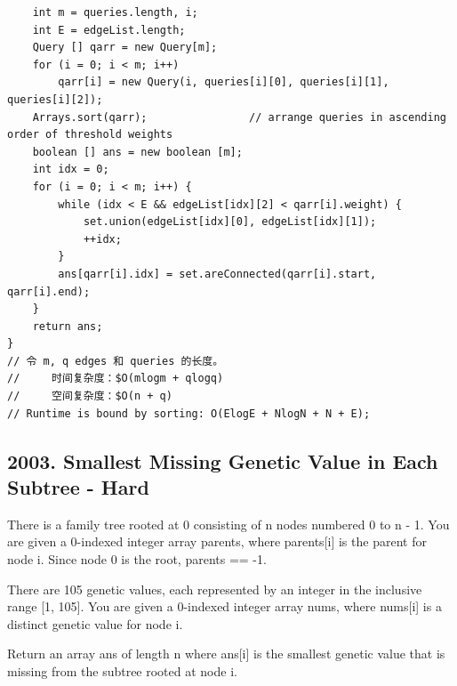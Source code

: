 \documentclass[9pt, b5paper]{article}
\begin{document}
\begin{verbatim}
    int m = queries.length, i;
    int E = edgeList.length;
    Query [] qarr = new Query[m];
    for (i = 0; i < m; i++) 
        qarr[i] = new Query(i, queries[i][0], queries[i][1], queries[i][2]);
    Arrays.sort(qarr);                // arrange queries in ascending order of threshold weights
    boolean [] ans = new boolean [m];
    int idx = 0;
    for (i = 0; i < m; i++) {
        while (idx < E && edgeList[idx][2] < qarr[i].weight) {
            set.union(edgeList[idx][0], edgeList[idx][1]);
            ++idx;
        }
        ans[qarr[i].idx] = set.areConnected(qarr[i].start, qarr[i].end);
    }
    return ans;
}
// 令 m, q edges 和 queries 的长度。
//     时间复杂度：$O(mlogm + qlogq)
//     空间复杂度：$O(n + q)
// Runtime is bound by sorting: O(ElogE + NlogN + N + E);
\end{verbatim}

\subsection{2003. Smallest Missing Genetic Value in Each Subtree - Hard}
\label{sec-11-2}
There is a family tree rooted at 0 consisting of n nodes numbered 0 to n - 1. You are given a 0-indexed integer array parents, where parents[i] is the parent for node i. Since node 0 is the root, parents\footnotemark[3]{} == -1.

There are 105 genetic values, each represented by an integer in the inclusive range [1, 105]. You are given a 0-indexed integer array nums, where nums[i] is a distinct genetic value for node i.

Return an array ans of length n where ans[i] is the smallest genetic value that is missing from the subtree rooted at node i.
\end{document}
